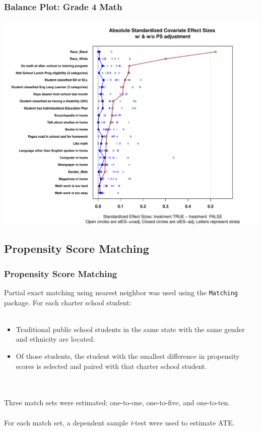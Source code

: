 \documentclass[10pt,handout,mathserif]{beamer}
\begin{document}
\begin{frame}[c]
	\frametitle{Balance Plot: Grade 4 Math}
	\begin{center}
	\includegraphics[height=0.86\textheight,keepaspectratio]{../Figures2009/g4math-lr-balance.pdf}
	\end{center}
\end{frame}


\subsection{Propensity Score Matching}

\begin{frame}[c]
    \frametitle{Propensity Score Matching}
    Partial exact matching using nearest neighbor was used using the \texttt{Matching} \cite{matching} package. For each charter school student:
    \ \\\ \\
    \begin{itemize}
    \setlength{\itemsep}{10pt}
        \item Traditional public school students in the same state with the same gender and ethnicity are located.
        \item Of those students, the student with the smallest difference in propensity scores is selected and paired with that charter school student.
    \end{itemize}
    \ \\\ \\
    Three match sets were estimated: one-to-one, one-to-five, and one-to-ten.
    \ \\\ \\
    For each match set, a dependent sample \textit{t}-test were used to estimate ATE.
\end{frame}
\end{document}

